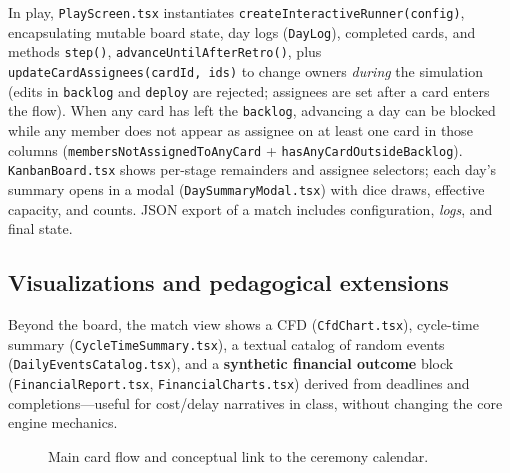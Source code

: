 In play, \texttt{PlayScreen.tsx} instantiates \texttt{createInteractiveRunner(config)}, encapsulating mutable board state, day logs (\texttt{DayLog}), completed cards, and methods \texttt{step()}, \texttt{advanceUntilAfterRetro()}, plus \texttt{updateCardAssignees(cardId,\,ids)} to change owners \emph{during} the simulation (edits in \texttt{backlog} and \texttt{deploy} are rejected; assignees are set after a card enters the flow). When any card has left the \texttt{backlog}, advancing a day can be blocked while any member does not appear as assignee on at least one card in those columns (\texttt{membersNotAssignedToAnyCard} + \texttt{hasAnyCardOutsideBacklog}). \texttt{KanbanBoard.tsx} shows per-stage remainders and assignee selectors; each day's summary opens in a modal (\texttt{DaySummaryModal.tsx}) with dice draws, effective capacity, and counts. JSON export of a match includes configuration, \emph{logs}, and final state.

\subsection{Visualizations and pedagogical extensions}
Beyond the board, the match view shows a CFD (\texttt{CfdChart.tsx}), cycle-time summary (\texttt{CycleTimeSummary.tsx}), a textual catalog of random events (\texttt{DailyEventsCatalog.tsx}), and a \textbf{synthetic financial outcome} block (\texttt{FinancialReport.tsx}, \texttt{FinancialCharts.tsx}) derived from deadlines and completions---useful for cost/delay narratives in class, without changing the core engine mechanics.

\begin{figure}[htbp]
  \centering
  \caption{Main card flow and conceptual link to the ceremony calendar.}
  \label{fig:fluxoQuadro}
\end{figure}

